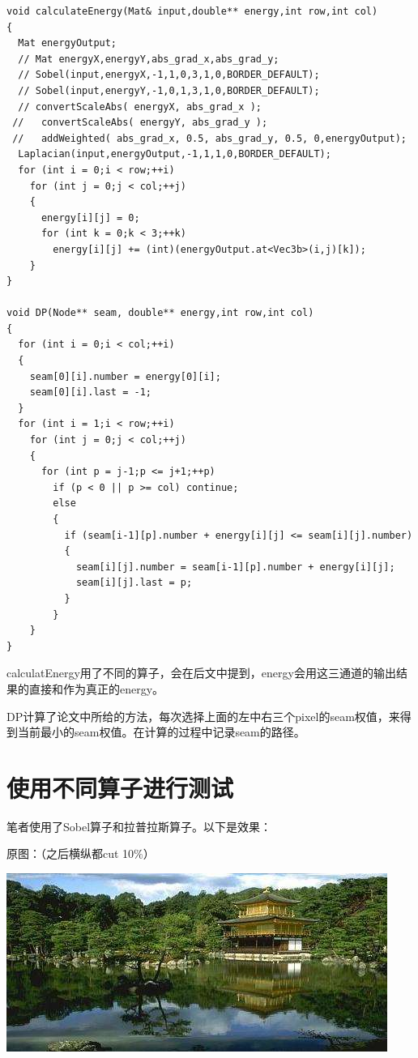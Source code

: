 \documentclass[10pt, a4paper]{article}
\begin{document}
    \begin{lstlisting}
void calculateEnergy(Mat& input,double** energy,int row,int col)
{
  Mat energyOutput;
  // Mat energyX,energyY,abs_grad_x,abs_grad_y;
  // Sobel(input,energyX,-1,1,0,3,1,0,BORDER_DEFAULT);
  // Sobel(input,energyY,-1,0,1,3,1,0,BORDER_DEFAULT);
  // convertScaleAbs( energyX, abs_grad_x );
 //   convertScaleAbs( energyY, abs_grad_y );
 //   addWeighted( abs_grad_x, 0.5, abs_grad_y, 0.5, 0,energyOutput);
  Laplacian(input,energyOutput,-1,1,1,0,BORDER_DEFAULT);
  for (int i = 0;i < row;++i)
    for (int j = 0;j < col;++j)
    {
      energy[i][j] = 0;
      for (int k = 0;k < 3;++k)
        energy[i][j] += (int)(energyOutput.at<Vec3b>(i,j)[k]);
    }
}    

void DP(Node** seam, double** energy,int row,int col)
{
  for (int i = 0;i < col;++i)
  {
    seam[0][i].number = energy[0][i];
    seam[0][i].last = -1;
  }
  for (int i = 1;i < row;++i)
    for (int j = 0;j < col;++j)
    {
      for (int p = j-1;p <= j+1;++p)
        if (p < 0 || p >= col) continue;
        else
        {
          if (seam[i-1][p].number + energy[i][j] <= seam[i][j].number)
          {
            seam[i][j].number = seam[i-1][p].number + energy[i][j];
            seam[i][j].last = p;
          }
        }
    }
}
    \end{lstlisting}
	   calculatEnergy用了不同的算子，会在后文中提到，energy会用这三通道的输出结果的直接和作为真正的energy。

     DP计算了论文中所给的方法，每次选择上面的左中右三个pixel的seam权值，来得到当前最小的seam权值。在计算的过程中记录seam的路径。
  \section{使用不同算子进行测试}
    笔者使用了Sobel算子和拉普拉斯算子。以下是效果：

    原图：（之后横纵都cut 10$\%$）

    \includegraphics[scale = .3]{input.jpeg}
\end{document}
